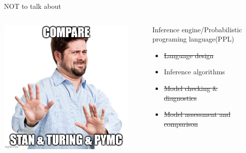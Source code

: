 \documentclass[bigger]{beamer}
\begin{document}
\begin{frame}[label={sec:orgdffadf6}]{NOT to talk about}
\begin{columns}
\begin{column}{0.33\columnwidth}
\begin{center}
\includegraphics[width=0.9\textwidth]{./figure/dont_want_3.jpg}
\end{center}
\end{column}

\begin{column}{0.33\columnwidth}
Inference engine/Probabilistic programing language(PPL)
\begin{itemize}
\item \sout{Language design}
\item Inference algorithms
\item \sout{Model checking \& diagnostics}
\item \sout{Model assessment and comparison}
\end{itemize}
\end{column}
\end{columns}
\end{frame}
\end{document}
